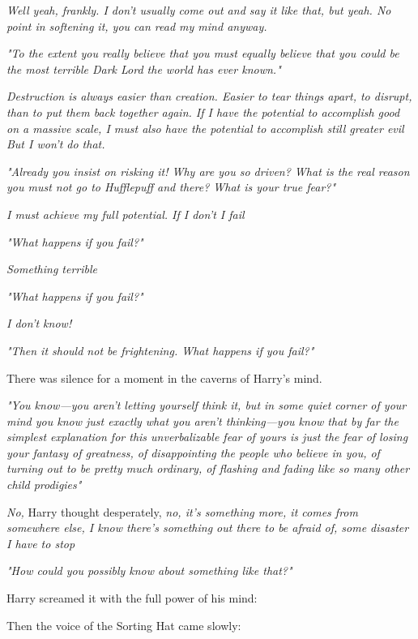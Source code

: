 \emph{Well{\el} yeah, frankly. I don't usually come out and say it like
that, but yeah. No point in softening it, you can read my mind anyway.}

\emph{"To the extent you really believe that{\el} you must equally believe
that you could be the most terrible Dark Lord the world has ever known."}

\emph{Destruction is always easier than creation. Easier to tear things apart,
    to disrupt, than to put them back together again. If I have the potential to
    accomplish good on a massive scale, I must also have the potential to
    accomplish still greater evil{\el} But I won't do that.}

\emph{"Already you insist on risking it! Why are you so driven? What is the
real reason you must not go to Hufflepuff and  there? What is
your true fear?"}

\emph{I must achieve my full potential. If I don't I{\el} fail{\el}}

\emph{"What happens if you fail?"}

\emph{Something terrible{\el}}

\emph{"What happens if you fail?"}

\emph{I don't know!}

\emph{"Then it should not be frightening. What happens if you fail?"}

\emph{}

There was silence for a moment in the caverns of Harry's mind.

\emph{"You know---you aren't letting yourself think it, but in some quiet
corner of your mind you know just exactly what you aren't
thinking---you know that by far the simplest explanation for this
unverbalizable fear of yours is just the fear of losing your fantasy of
greatness, of disappointing the people who believe in you, of turning out to be
pretty much ordinary, of flashing and fading like so many other child
prodigies{\el}"}

\emph{No,} Harry thought desperately, \emph{no, it's something more, it comes
from somewhere else, I know there's something out there to be afraid of, some
disaster I have to stop{\el}}

\emph{"How could you possibly know about something like that?"}

Harry screamed it with the full power of his mind: \emph{}

Then the voice of the Sorting Hat came slowly:

